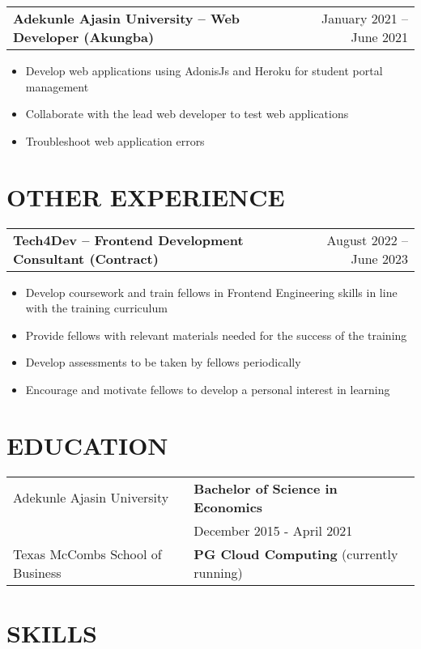\documentclass[a4paper,12pt]{article}
\makeatletter
\newenvironment{joblong}[2]
    {
    \begin{tabularx}{\linewidth}{@{}l X r@{}}
    \textbf{#1} & \hfill &  #2 \\[3.75pt]
    \end{tabularx}
    \begin{minipage}[t]{\linewidth}
    \begin{itemize}[nosep,after=\strut, leftmargin=1em, itemsep=3pt,label=--]
    }
    {
    \end{itemize}
    \end{minipage}    
    }
\makeatother
\begin{document}
\begin{joblong}{Adekunle Ajasin University -- Web Developer (Akungba)}{January 2021 -- June 2021}
\item Develop web applications using AdonisJs and Heroku for student portal management
\item Collaborate with the lead web developer to test web applications
\item Troubleshoot web application errors
\end{joblong}

\section{OTHER EXPERIENCE}

\begin{joblong}{Tech4Dev -- Frontend Development Consultant (Contract)}{August 2022 -- June 2023}
\item Develop coursework and train fellows in Frontend Engineering skills in line with the training curriculum
\item Provide fellows with relevant materials needed for the success of the training
\item Develop assessments to be taken by fellows periodically
\item Encourage and motivate fellows to develop a personal interest in learning
\end{joblong}

\section{EDUCATION}

\begin{tabularx}{\linewidth}{@{}l X@{}}
Adekunle Ajasin University & \textbf{Bachelor of Science in Economics} \\
                          & December 2015 - April 2021 \\[10pt]
Texas McCombs School of Business & \textbf{PG Cloud Computing} (currently running)
\end{tabularx}

\section{SKILLS}
\end{document}
